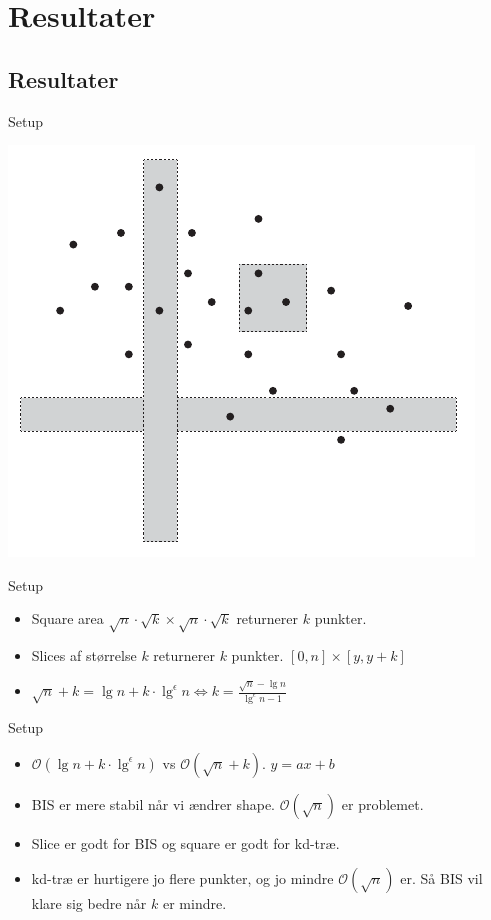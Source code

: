 \documentclass[pdf]{beamer}
\begin{document}
\section{Resultater}
\subsection{Resultater}

\begin{frame}{Setup}
  \begin{center}
    \includegraphics{pictures/felter.pdf}
  \end{center}
\end{frame}

\begin{frame}{Setup}
  \begin{itemize}
    \item Square area $\sqrt{n}\cdot\sqrt{k}\times\sqrt{n}\cdot\sqrt{k}$ returnerer $k$ punkter.
    \item Slices af størrelse $k$ returnerer $k$ punkter. $[0,n] \times [y, y+k]$
    \item $\sqrt{n}+k = \lg n + k\cdot\lg^\epsilon n \Leftrightarrow k = \frac{\sqrt{n}-\lg n}{\lg^\epsilon n -1}$
  \end{itemize}
\end{frame}

\begin{frame}{Setup}
      \begin{itemize}
        \item $\mathcal{O}(\lg n + k\cdot\lg^\epsilon n)$ vs $\mathcal{O}(\sqrt{n} + k)$. $y = ax + b$
        \item BIS er mere stabil når vi ændrer shape. $\mathcal{O}(\sqrt{n})$ er problemet.
        \item Slice er godt for BIS og square er godt for kd-træ.
        \item kd-træ er hurtigere jo flere punkter, og jo mindre $\mathcal{O}(\sqrt{n})$ er. Så BIS vil klare sig bedre når $k$ er mindre.
      \end{itemize}
\end{frame}
\end{document}
